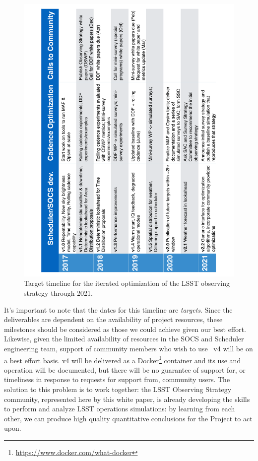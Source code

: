 \begin{figure}[t!]
\includegraphics[angle=270,width=0.99\linewidth,clip]{figs/opsim_timeline.pdf}
\vskip -0.4in
\caption{Target timeline for the iterated optimization of the LSST observing strategy through 2021.}
\label{fig:timeline}
\end{figure}

It's important to note that the dates for this timeline are {\it
targets}. Since the deliverables are dependent on the availability of
project resources, these milestones should be considered as those we
could achieve given our best effort. Likewise, given the limited
availability of resources in the SOCS and Scheduler engineering team,
support of community members who wish to use \OpSim~v4 will be on a best
effort basis. \OpSim v4 will be delivered as a Docker\footnote{\url{https://www.docker.com/what-docker}} container and its
use and operation will be documented, but there will be no guarantee of
support for, or timeliness in response to requests for support from,
community users. The solution to this problem is to work together: the LSST Observing Strategy community, represented here by this white paper, is already developing the skills to perform and analyze LSST operations simulations: by learning from each other, we can produce high quality quantitative conclusions for the Project to act upon.



